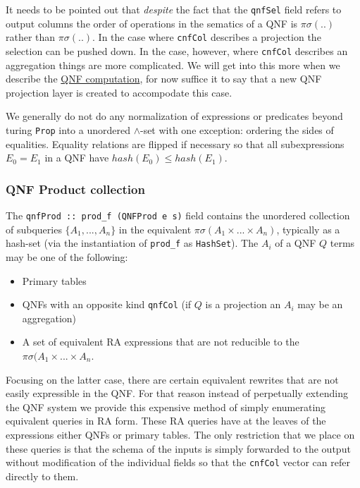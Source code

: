 It needs to be pointed out that \emph{despite} the fact that the \texttt{qnfSel}
field refers to output columns the order of operations in the sematics
of a QNF is \(\pi\sigma(..)\) rather than \(\pi\sigma(..)\). In the
case where \texttt{cnfCol} describes a projection the selection can be pushed
down. In the case, however, where \texttt{cnfCol} describes an aggregation
things are more complicated. We will get into this more when we
describe the \hyperref[sec:org3f1036f]{QNF computation}, for now suffice it to say that a new QNF
projection layer is created to accompodate this case.

We generally do not do any normalization of expressions or predicates
beyond turing \texttt{Prop} into a unordered \(\land\)-set with one
exception: ordering the sides of equalities. Equality relations are
flipped if necessary so that all subexpressions \(E_0 = E_1\) in a QNF
have \(hash(E_0) \le hash(E_1)\).


\subsubsection{QNF Product collection}
\label{sec:org86e5e2d}
The \texttt{qnfProd :: prod\_f (QNFProd e s)} field contains the
unordered collection of subqueries \(\{A_1,... , A_n\}\) in the
equivalent \(\pi \sigma (A_1 \times ... \times A_n)\), typically as a
hash-set (via the instantiation of \texttt{prod\_f} as
\texttt{HashSet}). The \(A_i\) of a QNF \(Q\) terms may be one of the
following:

\begin{itemize}
\item Primary tables
\item QNFs with an opposite kind \texttt{qnfCol} (if \(Q\) is a projection an
  \(A_i\) may be an aggregation)
\item A set of equivalent RA expressions that are not reducible to the
  \(\pi \sigma(A_1 \times ... \times A_n\).
\end{itemize}

Focusing on the latter case, there are certain equivalent rewrites
that are not easily expressible in the QNF. For that reason instead of
perpetually extending the QNF system we provide this expensive method
of simply enumerating equivalent queries in RA form. These RA queries
have at the leaves of the expressions either QNFs or primary
tables. The only restriction that we place on these queries is that
the schema of the inputs is simply forwarded to the output without
modification of the individual fields so that the \texttt{cnfCol} vector can
refer directly to them.

